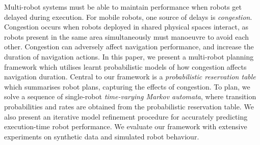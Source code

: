 \documentclass[12pt]{article}
\begin{document}
\begin{enumerate}
Multi-robot systems must be able to maintain performance when robots get delayed during execution.
%
For mobile robots, one source of delays is \emph{congestion}.
%
Congestion occurs when robots deployed in shared physical spaces interact, as robots present in the same area simultaneously must manoeuvre to avoid each other.
%
Congestion can adversely affect navigation performance, and increase the duration of navigation actions.
%
In this paper, we present a multi-robot planning framework which utilises learnt probabilistic models of how congestion affects navigation duration. 
%
Central to our framework is a \emph{probabilistic reservation table} which summarises robot plans, capturing the effects of congestion.
%
To plan, we solve a sequence of single-robot \emph{time-varying Markov automata}, where transition probabilities and rates are obtained from the probabilistic reservation table.
% 
We also present an iterative model refinement procedure for accurately predicting execution-time robot performance.
% 
We evaluate our framework with extensive experiments on synthetic data and simulated robot behaviour.

\end{enumerate}
\end{document}
